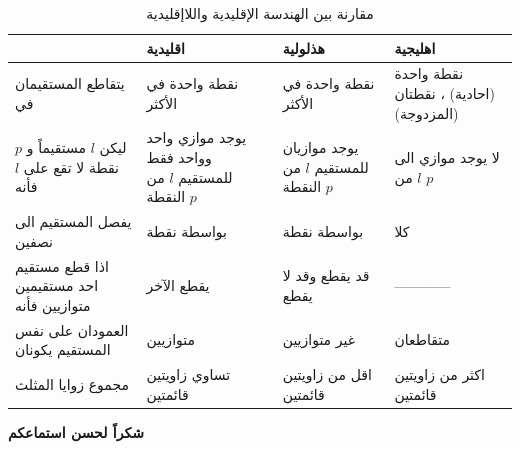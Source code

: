 			\begin{frame}
				\begin{table}[ht!]
					\centering
					\begin{tabular}{|p{3cm}|p{3cm}|p{3cm}|p{3cm}|}
						\hline
						{}& \textbf{اقليدية} & \textbf{هذلولية} & \textbf{اهليجية} \\\hline
						يتقاطع المستقيمان في & نقطة واحدة في الأكثر & نقطة واحدة في الأكثر & نقطة واحدة (احادية) ، نقطتان (المزدوجة)\\\hline
						ليكن $l$ مستقيماً و $p$ نقطة لا تقع على $l$ فأنه & يوجد موازي واحد وواحد فقط للمستقيم $l$ من النقطة $p$ & يوجد موازيان للمستقيم $l$ من النقطة $p$ & لا يوجد موازي الى $l$ من $p$ \\\hline
						يفصل المستقيم الى نصفين & بواسطة نقطة & بواسطة نقطة & كلا\\\hline
						اذا قطع مستقيم احد مستقيمين متوازيين فأنه & يقطع الآخر & قد يقطع وقد لا يقطع & ------------\\
						\hline
						العمودان على نفس المستقيم يكونان & متوازيين & غير متوازيين & متقاطعان \\
						\hline
						مجموع زوايا المثلث  & تساوي زاويتين قائمتين & اقل من زاويتين قائمتين & اكثر من زاويتين قائمتين\\
						\hline
					\end{tabular}
					\caption{مقارنة بين الهندسة الإقليدية واللاإقليدية}
				\end{table}
			\end{frame}
			
			\begin{frame}
		\begin{center}
			\Huge
			\textbf{شكراً لحسن استماعكم}
		\end{center}
	\end{frame}
